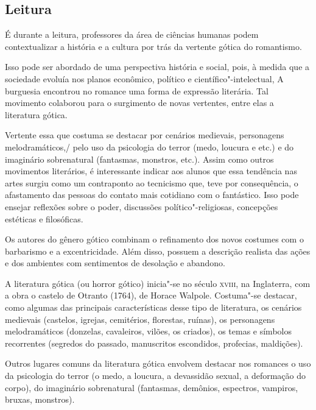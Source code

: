 \documentclass[12pt]{extarticle}
\begin{document}

\subsection{Leitura}

É durante a leitura, professores da área de ciências humanas
podem contextualizar a história e a cultura por trás da vertente gótica
do romantismo.

Isso pode ser abordado de uma perspectiva história e social, pois, à
medida que a sociedade evoluía nos planos econômico, político e
científico"-intelectual, A burguesia encontrou no romance uma forma de
expressão literária. Tal movimento colaborou para o surgimento de novas
vertentes, entre elas a literatura gótica.

Vertente essa que costuma se destacar por cenários medievais,
personagens melodramáticos,/ pelo uso da psicologia do terror (medo,
loucura e etc.) e do imaginário sobrenatural (fantasmas, monstros,
etc.). Assim como outros movimentos literários, é interessante indicar
aos alunos que essa tendência nas artes surgiu como um contraponto ao
tecnicismo que, teve por consequência, o afastamento das pessoas do
contato mais cotidiano com o fantástico. Isso pode ensejar reflexões
sobre o poder, discussões político"-religiosas, concepções estéticas e
filosóficas.


Os autores do gênero gótico combinam o refinamento dos novos costumes
com o barbarismo e a excentricidade. Além disso, possuem a descrição
realista das ações e dos ambientes com sentimentos de desolação e
abandono.

A literatura gótica (ou horror gótico) inicia"-se no século \textsc{xviii}, na
Inglaterra, com a obra o castelo de Otranto (1764), de Horace Walpole.
Costuma"-se destacar, como algumas das principais características desse
tipo de literatura, os cenários medievais (castelos, igrejas,
cemitérios, florestas, ruínas), os personagens melodramáticos (donzelas,
cavaleiros, vilões, os criados), os temas e símbolos recorrentes
(segredos do passado, manuscritos escondidos, profecias, maldições).

Outros lugares comuns da literatura gótica envolvem destacar nos
romances o uso da psicologia do terror (o medo, a loucura, a devassidão
sexual, a deformação do corpo), do imaginário sobrenatural (fantasmas,
demônios, espectros, vampiros, bruxas, monstros).
\end{document}
